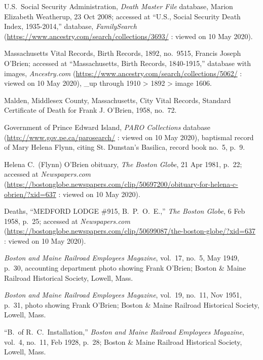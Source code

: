 \begin{thebibliography}{999}
	U.S.\ Social Security Administration, \textit{Death Master File} database, Marion Elizabeth Weatherup, 23 Oct 2008; accessed at ``U.S., Social Security Death Index, 1935-2014,'' database, \textit{FamilySearch} (\url{https://www.ancestry.com/search/collections/3693/} : viewed on 10 May 2020).
	
	Massachusetts Vital Records, Birth Records, 1892, no.\ 9515, Francis Joseph O'Brien; accessed at ``Massachusetts, Birth Records, 1840-1915,'' database with images, \textit{Ancestry.com} (\url{https://www.ancestry.com/search/collections/5062/} : viewed on 10 May 2020), \_up through 1910 > 1892 > image 1606.
	
	Malden, Middlesex County, Massachusetts, City Vital Records, Standard Certificate of Death for Frank J. O'Brien, 1958, no.\ 72.
	
	Government of Prince Edward Island, \textit{PARO Collections} database (\url{http://www.gov.pe.ca/parosearch/} : viewed on 10 May 2020), baptismal record of Mary Helena Flynn, citing St. Dunstan's Basilica, record book no.\ 5, p.\ 9.
	
	Helena C.\ (Flynn) O'Brien obituary, \textit{The Boston Globe}, 21 Apr 1981, p.\ 22; accessed at \textit{Newspapers.com} (\url{https://bostonglobe.newspapers.com/clip/50697200/obituary-for-helena-c-obrien/?xid=637} : viewed on 10 May 2020).
	
	Deaths, ``MEDFORD LODGE \#915, B.\ P.\ O.\ E.,'' \textit{The Boston Globe}, 6 Feb 1958, p.\ 25; accessed at \textit{Newspapers.com} (\url{https://bostonglobe.newspapers.com/clip/50699087/the-boston-globe/?xid=637} : viewed on 10 May 2020).
	
	\textit{Boston and Maine Railroad Employees Magazine}, vol.\ 17, no.\ 5, May 1949, p.\ 30, accounting department photo showing Frank O'Brien; Boston \& Maine Railroad Historical Society, Lowell, Mass.
	
	\textit{Boston and Maine Railroad Employees Magazine}, vol.\ 19, no.\ 11, Nov 1951, p.\ 31, photo showing Frank O'Brien; Boston \& Maine Railroad Historical Society, Lowell, Mass.
	
	``B.\ of R.\ C.\ Installation,'' \textit{Boston and Maine Railroad Employees Magazine}, vol.\ 4, no.\ 11, Feb 1928, p.\ 28; Boston \& Maine Railroad Historical Society, Lowell, Mass.
	

\end{thebibliography}
